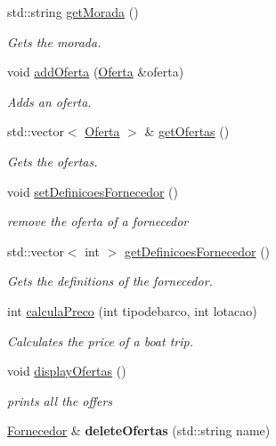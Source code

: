 \begin{DoxyCompactItemize}
std\+::string \hyperlink{classFornecedor_ae71fba3a196f749f54956fdbb25ede6a}{get\+Morada} ()
\begin{DoxyCompactList}\small\item\em Gets the morada. \end{DoxyCompactList}\item 
void \hyperlink{classFornecedor_a220373fd19f44a30d7c6c1ec913be700}{add\+Oferta} (\hyperlink{classOferta}{Oferta} \&oferta)
\begin{DoxyCompactList}\small\item\em Adds an oferta. \end{DoxyCompactList}\item 
std\+::vector$<$ \hyperlink{classOferta}{Oferta} $>$ \& \hyperlink{classFornecedor_a7ef7f5f79e2c61aaca5d60c06b2a0051}{get\+Ofertas} ()
\begin{DoxyCompactList}\small\item\em Gets the ofertas. \end{DoxyCompactList}\item 
void \hyperlink{classFornecedor_a0a0945cbd2fd120d9eab5d5aec441b72}{set\+Definicoes\+Fornecedor} ()
\begin{DoxyCompactList}\small\item\em remove the oferta of a fornecedor \end{DoxyCompactList}\item 
std\+::vector$<$ int $>$ \hyperlink{classFornecedor_a94de4f30aa8328ce58dc1a8ec18e24c2}{get\+Definicoes\+Fornecedor} ()
\begin{DoxyCompactList}\small\item\em Gets the definitions of the fornecedor. \end{DoxyCompactList}\item 
int \hyperlink{classFornecedor_a53594b9690eb9ed098b5c9baa3d46c31}{calcula\+Preco} (int tipodebarco, int lotacao)
\begin{DoxyCompactList}\small\item\em Calculates the price of a boat trip. \end{DoxyCompactList}\item 
\mbox{\label{classFornecedor_a858875f921d2eebb652c4b7628f95c71}} 
void \hyperlink{classFornecedor_a858875f921d2eebb652c4b7628f95c71}{display\+Ofertas} ()
\begin{DoxyCompactList}\small\item\em prints all the offers \end{DoxyCompactList}\item 
\mbox{\label{classFornecedor_a55df81a932be74bc25122639c64ab5a0}} 
\hyperlink{classFornecedor}{Fornecedor} \& {\bfseries delete\+Ofertas} (std\+::string name)
\end{DoxyCompactItemize}



